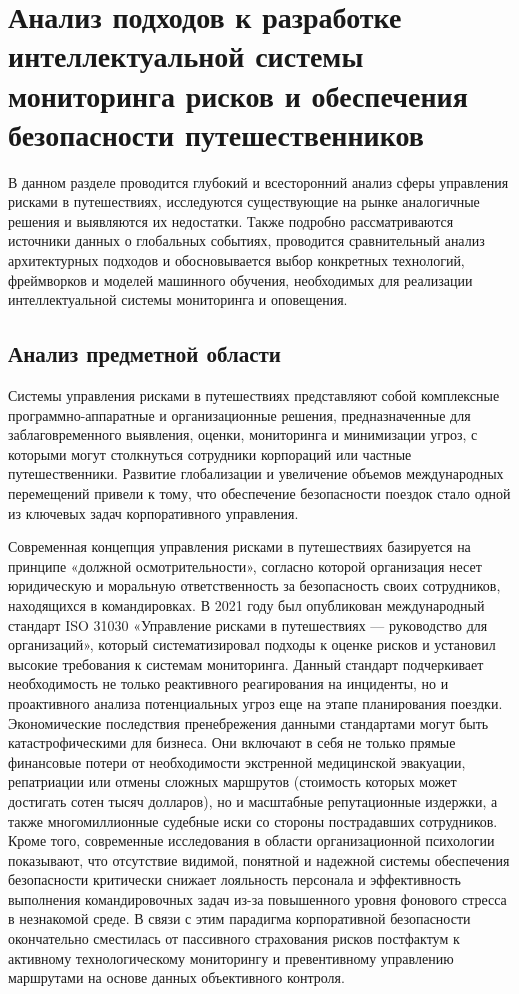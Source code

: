 \section{Анализ подходов к разработке интеллектуальной системы мониторинга рисков и обеспечения безопасности путешественников}
\label{sec:analysis}

В данном разделе проводится глубокий и всесторонний анализ сферы управления рисками в путешествиях, исследуются существующие на рынке аналогичные решения и выявляются их недостатки. Также подробно рассматриваются источники данных о глобальных событиях, проводится сравнительный анализ архитектурных подходов и обосновывается выбор конкретных технологий, фреймворков и моделей машинного обучения, необходимых для реализации интеллектуальной системы мониторинга и оповещения.

\subsection{Анализ предметной области}

Системы управления рисками в путешествиях представляют собой комплексные программно-аппаратные и организационные решения, предназначенные для заблаговременного выявления, оценки, мониторинга и минимизации угроз, с которыми могут столкнуться сотрудники корпораций или частные путешественники. Развитие глобализации и увеличение объемов международных перемещений привели к тому, что обеспечение безопасности поездок стало одной из ключевых задач корпоративного управления.

Современная концепция управления рисками в путешествиях базируется на принципе «должной осмотрительности», согласно которой организация несет юридическую и моральную ответственность за безопасность своих сотрудников, находящихся в командировках. В 2021 году был опубликован международный стандарт ISO 31030 «Управление рисками в путешествиях — руководство для организаций»\cite{iso_31030_bib}, который систематизировал подходы к оценке рисков и установил высокие требования к системам мониторинга. Данный стандарт подчеркивает необходимость не только реактивного реагирования на инциденты, но и проактивного анализа потенциальных угроз еще на этапе планирования поездки. Экономические последствия пренебрежения данными стандартами могут быть катастрофическими для бизнеса. Они включают в себя не только прямые финансовые потери от необходимости экстренной медицинской эвакуации, репатриации или отмены сложных маршрутов (стоимость которых может достигать сотен тысяч долларов), но и масштабные репутационные издержки, а также многомиллионные судебные иски со стороны пострадавших сотрудников. Кроме того, современные исследования в области организационной психологии показывают, что отсутствие видимой, понятной и надежной системы обеспечения безопасности критически снижает лояльность персонала и эффективность выполнения командировочных задач из-за повышенного уровня фонового стресса в незнакомой среде. В связи с этим парадигма корпоративной безопасности окончательно сместилась от пассивного страхования рисков постфактум к активному технологическому мониторингу и превентивному управлению маршрутами на основе данных объективного контроля.

